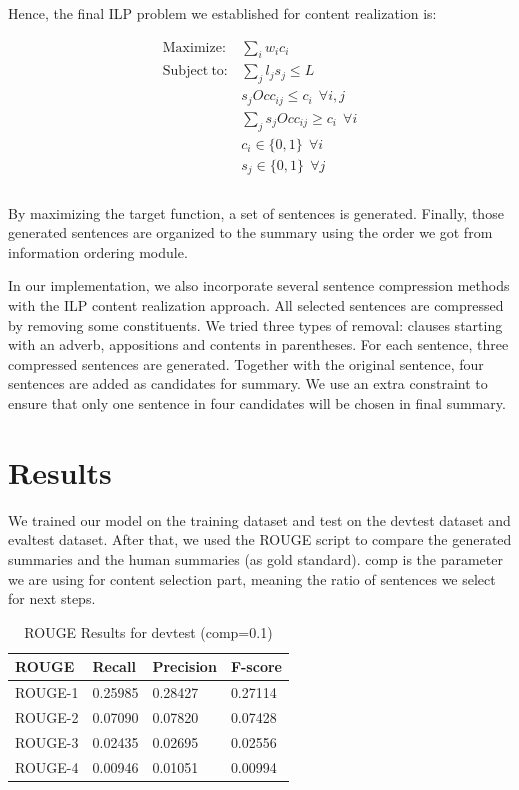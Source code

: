 \documentclass[11pt]{article}
\begin{document}
Hence, the final ILP problem we established for content realization is:

\begin{equation}
	\begin{aligned}
	\mathrm{Maximize:} & \sum_i{w_ic_i} \\
	\mathrm{Subject\ to:} & \sum_j{l_js_j} \leq L \\
 	& s_jOcc_{ij} \leq c_i\ \ \forall i,j\\
	& \sum_j s_jOcc_{ij} \geq c_i\ \ \forall i \\
	& c_i \in \{0,1\}\ \ \forall i \\
	& s_j \in \{0,1\}\ \ \forall j \\
	\end{aligned}
\end{equation}
\\
\indent
By maximizing the target function, a set of sentences is generated. Finally, those generated sentences are organized to the summary using the order we got from information ordering module.

In our implementation, we also incorporate several sentence compression methods with the ILP content realization approach. All selected sentences are compressed by removing some constituents. We tried three types of removal: clauses starting with an adverb, appositions and contents in parentheses. For each sentence, three compressed sentences are generated. Together with the original sentence, four sentences are added as candidates for summary. We use an extra constraint to ensure that only one sentence in four candidates will be chosen in final summary. 

\section{Results}

We trained our model on the training dataset and test on the devtest dataset and evaltest dataset. After that, we used the ROUGE script to compare the generated summaries and the human summaries (as gold standard). comp is the parameter we are using for content selection part, meaning the ratio of sentences we select for next steps. 

\begin{table}[!ht]
\centering
\caption{ROUGE Results for devtest (comp=0.1)}
\begin{tabular}{|l|l|l|l|}
\hline
ROUGE   & Recall  & Precision & F-score \\ \hline
ROUGE-1 & 0.25985 & 0.28427   & 0.27114 \\ \hline
ROUGE-2 & 0.07090 & 0.07820   & 0.07428 \\ \hline
ROUGE-3 & 0.02435 & 0.02695   & 0.02556 \\ \hline
ROUGE-4 & 0.00946 & 0.01051   & 0.00994 \\ \hline
\end{tabular}
\end{table}
\end{document}
